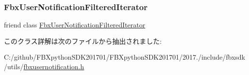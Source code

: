 \subsubsection{\texorpdfstring{Fbx\+User\+Notification\+Filtered\+Iterator}{FbxUserNotificationFilteredIterator}}
{\footnotesize\ttfamily friend class \hyperlink{class_fbx_user_notification_filtered_iterator}{Fbx\+User\+Notification\+Filtered\+Iterator}\hspace{0.3cm}{\ttfamily [friend]}}



このクラス詳解は次のファイルから抽出されました\+:\begin{DoxyCompactItemize}
\item 
C\+:/github/\+F\+B\+Xpython\+S\+D\+K201701/\+F\+B\+Xpython\+S\+D\+K201701/2017./include/fbxsdk/utils/\hyperlink{fbxusernotification_8h}{fbxusernotification.\+h}\end{DoxyCompactItemize}
